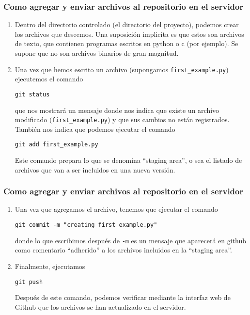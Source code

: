 \documentclass{beamer}
\begin{document}
\begin{frame}[fragile]
\frametitle{Como agregar y enviar archivos al repositorio en el servidor}

\begin{enumerate}

\item Dentro del directorio controlado (el directorio del proyecto), podemos crear los archivos que deseemos. 
Una suposici\'{o}n impl\'{\i}cita es que estos son archivos de texto, que contienen programas escritos en python o c (por ejemplo).
Se supone que no son archivos binarios de gran magnitud.

\item Una vez que hemos escrito un archivo (supongamos \verb|first_example.py|) ejecutemos el comando
\begin{verbatim}
git status
\end{verbatim}
que nos mostrar\'{a} un mensaje donde nos indica que existe un archivo modificado (\verb|first_example.py|) 
y que sus cambios no est\'{a}n registrados.
Tambi\'{e}n nos indica que podemos ejecutar el comando
\begin{verbatim}
git add first_example.py
\end{verbatim}
Este comando prepara lo que se denomina ``staging area'', o sea el listado de archivos que van a ser incluidos en una nueva versi\'{o}n.

\end{enumerate}

\end{frame}

\begin{frame}[fragile]
\frametitle{Como agregar y enviar archivos al repositorio en el servidor}

\begin{enumerate}

\item Una vez que agregamos el archivo, tenemos que ejecutar el comando
\begin{verbatim}
git commit -m "creating first_example.py"
\end{verbatim}
donde lo que escribimos despu\'{e}s de \verb|-m| es un mensaje que aparecer\'{a} en github como comentario ``adherido'' a los archivos incluidos en la ``staging area''.

\item Finalmente, ejecutamos
\begin{verbatim}
git push
\end{verbatim}
Despu\'{e}s de este comando, podemos verificar mediante la interfaz web de Github que los archivos se han actualizado en el servidor.
\end{enumerate}

\end{frame}
\end{document}
